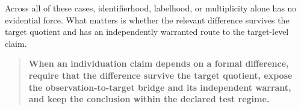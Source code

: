 \documentclass[11pt]{article}
\begin{document}
Across all of these cases, identifierhood, labelhood, or multiplicity alone has no evidential force. What matters is whether the relevant difference survives the target quotient and has an independently warranted route to the target-level claim.

\begin{quote}
\textbf{When an individuation claim depends on a formal difference, require that the difference survive the target quotient, expose the observation-to-target bridge and its independent warrant, and keep the conclusion within the declared test regime.}
\end{quote}



\end{document}
